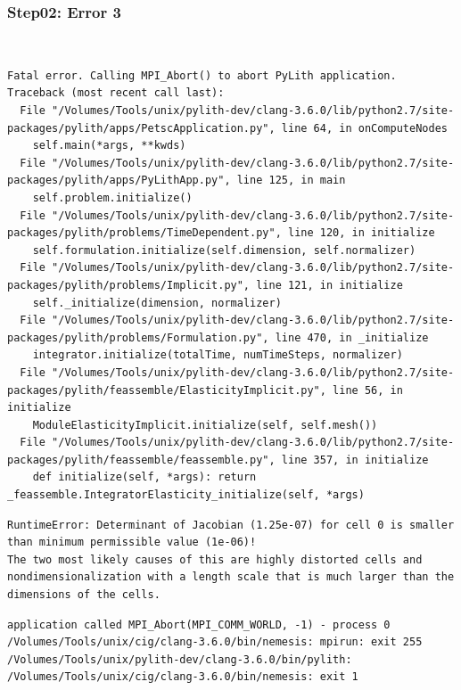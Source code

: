 \documentclass{beamer}
\begin{document}
\begin{frame}[fragile]
  \frametitle{Step02: Error 3}

\\
\begin{lstlisting}
Fatal error. Calling MPI_Abort() to abort PyLith application.
Traceback (most recent call last):
  File "/Volumes/Tools/unix/pylith-dev/clang-3.6.0/lib/python2.7/site-packages/pylith/apps/PetscApplication.py", line 64, in onComputeNodes
    self.main(*args, **kwds)
  File "/Volumes/Tools/unix/pylith-dev/clang-3.6.0/lib/python2.7/site-packages/pylith/apps/PyLithApp.py", line 125, in main
    self.problem.initialize()
  File "/Volumes/Tools/unix/pylith-dev/clang-3.6.0/lib/python2.7/site-packages/pylith/problems/TimeDependent.py", line 120, in initialize
    self.formulation.initialize(self.dimension, self.normalizer)
  File "/Volumes/Tools/unix/pylith-dev/clang-3.6.0/lib/python2.7/site-packages/pylith/problems/Implicit.py", line 121, in initialize
    self._initialize(dimension, normalizer)
  File "/Volumes/Tools/unix/pylith-dev/clang-3.6.0/lib/python2.7/site-packages/pylith/problems/Formulation.py", line 470, in _initialize
    integrator.initialize(totalTime, numTimeSteps, normalizer)
  File "/Volumes/Tools/unix/pylith-dev/clang-3.6.0/lib/python2.7/site-packages/pylith/feassemble/ElasticityImplicit.py", line 56, in initialize
    ModuleElasticityImplicit.initialize(self, self.mesh())
  File "/Volumes/Tools/unix/pylith-dev/clang-3.6.0/lib/python2.7/site-packages/pylith/feassemble/feassemble.py", line 357, in initialize
    def initialize(self, *args): return _feassemble.IntegratorElasticity_initialize(self, *args)
\end{lstlisting}
\begin{lstlisting}
RuntimeError: Determinant of Jacobian (1.25e-07) for cell 0 is smaller than minimum permissible value (1e-06)!
The two most likely causes of this are highly distorted cells and nondimensionalization with a length scale that is much larger than the dimensions of the cells.
\end{lstlisting}
\begin{lstlisting}
application called MPI_Abort(MPI_COMM_WORLD, -1) - process 0
/Volumes/Tools/unix/cig/clang-3.6.0/bin/nemesis: mpirun: exit 255
/Volumes/Tools/unix/pylith-dev/clang-3.6.0/bin/pylith: /Volumes/Tools/unix/cig/clang-3.6.0/bin/nemesis: exit 1
\end{lstlisting}
  
\end{frame}
\end{document}
